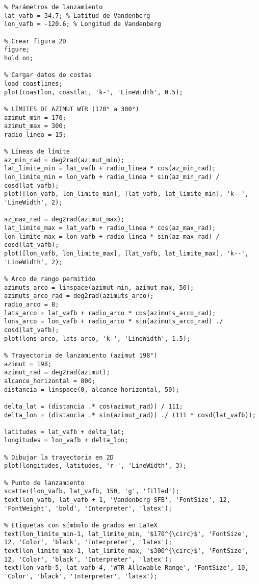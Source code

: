 \begin{verbatim}
% Parámetros de lanzamiento
lat_vafb = 34.7; % Latitud de Vandenberg
lon_vafb = -120.6; % Longitud de Vandenberg

% Crear figura 2D
figure;
hold on;

% Cargar datos de costas
load coastlines;
plot(coastlon, coastlat, 'k-', 'LineWidth', 0.5);

% LÍMITES DE AZIMUT WTR (170° a 300°)
azimut_min = 170; 
azimut_max = 300; 
radio_linea = 15; 

% Líneas de límite
az_min_rad = deg2rad(azimut_min);
lat_limite_min = lat_vafb + radio_linea * cos(az_min_rad);
lon_limite_min = lon_vafb + radio_linea * sin(az_min_rad) / cosd(lat_vafb);
plot([lon_vafb, lon_limite_min], [lat_vafb, lat_limite_min], 'k--', 'LineWidth', 2);

az_max_rad = deg2rad(azimut_max);
lat_limite_max = lat_vafb + radio_linea * cos(az_max_rad);
lon_limite_max = lon_vafb + radio_linea * sin(az_max_rad) / cosd(lat_vafb);
plot([lon_vafb, lon_limite_max], [lat_vafb, lat_limite_max], 'k--', 'LineWidth', 2);

% Arco de rango permitido
azimuts_arco = linspace(azimut_min, azimut_max, 50);
azimuts_arco_rad = deg2rad(azimuts_arco);
radio_arco = 8;
lats_arco = lat_vafb + radio_arco * cos(azimuts_arco_rad);
lons_arco = lon_vafb + radio_arco * sin(azimuts_arco_rad) ./ cosd(lat_vafb);
plot(lons_arco, lats_arco, 'k-', 'LineWidth', 1.5);

% Trayectoria de lanzamiento (azimut 198°)
azimut = 198;
azimut_rad = deg2rad(azimut);
alcance_horizontal = 800;
distancia = linspace(0, alcance_horizontal, 50);

delta_lat = (distancia .* cos(azimut_rad)) / 111;
delta_lon = (distancia .* sin(azimut_rad)) ./ (111 * cosd(lat_vafb));

latitudes = lat_vafb + delta_lat;
longitudes = lon_vafb + delta_lon;

% Dibujar la trayectoria en 2D
plot(longitudes, latitudes, 'r-', 'LineWidth', 3);

% Punto de lanzamiento
scatter(lon_vafb, lat_vafb, 150, 'g', 'filled');
text(lon_vafb, lat_vafb + 1, 'Vandenberg SFB', 'FontSize', 12, 'FontWeight', 'bold', 'Interpreter', 'latex');

% Etiquetas con símbolo de grados en LaTeX
text(lon_limite_min-1, lat_limite_min, '$170^{\circ}$', 'FontSize', 12, 'Color', 'black', 'Interpreter', 'latex');
text(lon_limite_max-1, lat_limite_max, '$300^{\circ}$', 'FontSize', 12, 'Color', 'black', 'Interpreter', 'latex');
text(lon_vafb-5, lat_vafb-4, 'WTR Allowable Range', 'FontSize', 10, 'Color', 'black', 'Interpreter', 'latex');


\end{verbatim}

